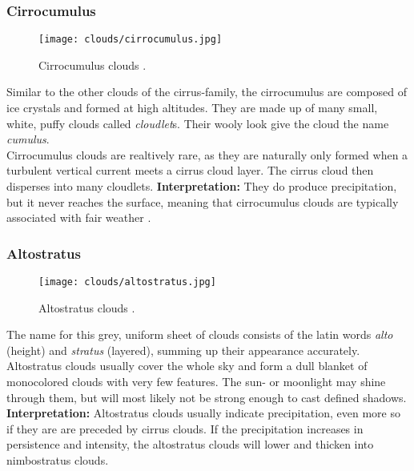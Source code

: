 \subsubsection{Cirrocumulus}
\begin{wrapfigure}[10]{r}{6cm}
    \vspace{-\baselineskip}
    \texttt{[image: clouds/cirrocumulus.jpg]}
    \caption{Cirrocumulus clouds \protect\cite{cloudtypes:wiki:cirrocumulus}.}
    \label{img:clouds:cirrocumulus}
\end{wrapfigure}
Similar to the other clouds of the cirrus-family, the cirrocumulus are composed of ice crystals and formed at high \gls{altitude}s.
They are made up of many small, white, puffy clouds called \emph{\gls{cloudlet}}s. Their wooly look give the cloud the name \emph{cumulus}.
\\
\noindent
Cirrocumulus clouds are realtively rare, as they are naturally only formed when a turbulent vertical current meets a cirrus cloud layer. The cirrus cloud then disperses into many \gls{cloudlet}s.
\emptyline
\textbf{Interpretation:} 
They do produce \gls{precipitation}, but it never reaches the surface, meaning that cirrocumulus clouds are typically associated with fair weather \cite{cloudtypes:meteoblue}.

\clearpage

\subsubsection{Altostratus}
\begin{wrapfigure}[10]{r}{6cm}
    \vspace{-\baselineskip}
    \texttt{[image: clouds/altostratus.jpg]}
    \caption{Altostratus clouds \protect\cite{cloudtypes:meteoblue}.}
    \label{img:clouds:altostratus}
\end{wrapfigure}
The name for this grey, uniform sheet of clouds consists of the latin words \emph{alto} (height) and \emph{stratus} (layered), summing up their appearance accurately.
Altostratus clouds usually cover the whole sky and form a dull blanket of monocolored clouds with very few features.
The sun- or moonlight may shine through them, but will most likely not be strong enough to cast defined shadows.
\emptyline
\textbf{Interpretation:}
Altostratus clouds usually indicate \gls{precipitation}, even more so if they are are preceded by cirrus clouds.
If the \gls{precipitation} increases in persistence and intensity, the altostratus clouds will lower and thicken into nimbostratus clouds.


